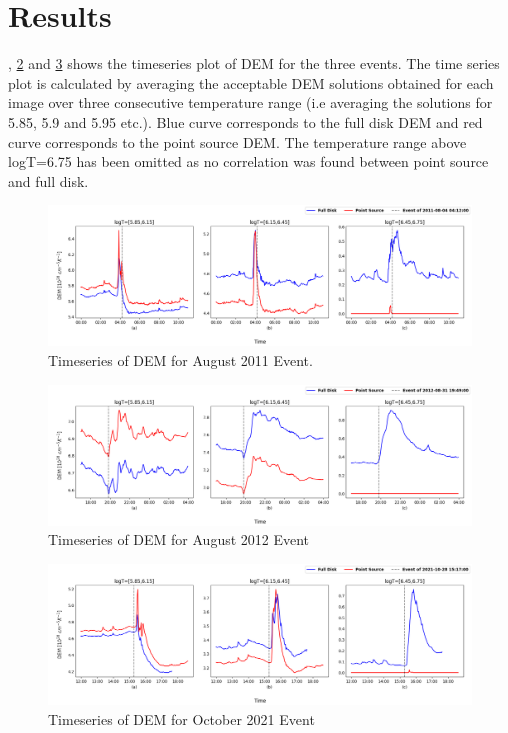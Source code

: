 \section{Results}

, \cref{fig:dem_ts_aug_31_2012} and \cref{fig:dem_ts_oct_28_2021} shows the timeseries plot of DEM for the three events. The time series plot is calculated by averaging the acceptable DEM solutions obtained for each image over three consecutive temperature range (i.e averaging the solutions for 5.85, 5.9 and 5.95 etc.). Blue curve corresponds to the full disk DEM and red curve corresponds to the point source DEM. The temperature range above logT=6.75 has been omitted as no correlation was found between point source and full disk.

\begin{figure}[h!]
    \centering
    \includegraphics[width=\textwidth]{images/dem_ts_aug_04_2011.png}
    \caption[DEM Timeseries for  August 2011 Event]{Timeseries of DEM for  August 2011 Event.}
    \label{fig:dem_ts_aug_04_2011}
\end{figure}

\begin{figure}[h!]
    \centering
    \includegraphics[width=\textwidth]{images/dem_ts_aug_31_2012.png}
    \caption[DEM Timeseries for  August 2012 Event]{Timeseries of DEM for  August 2012 Event}
    \label{fig:dem_ts_aug_31_2012}
\end{figure}

\begin{figure}[h!]
    \centering
    \includegraphics[width=\textwidth]{images/dem_ts_oct_28_2021.png}
    \caption[DEM Timeseries for  October 2021 Event]{Timeseries of DEM for  October 2021 Event}
    \label{fig:dem_ts_oct_28_2021}
\end{figure}

